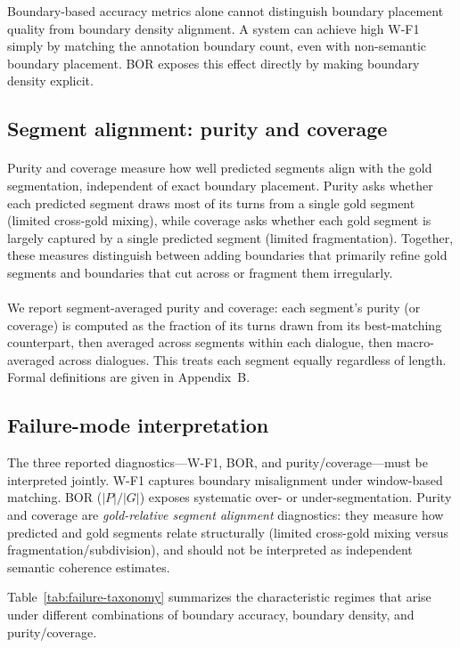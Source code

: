 \documentclass{article}
\makeatletter
\newcommand{\myparagraph}[1]{%
  \paragraph{\@addpunct{#1}}%
}
\makeatother
\begin{document}
Boundary-based accuracy metrics alone cannot distinguish boundary
placement quality from boundary density alignment. A system can achieve
high W-F1 simply by matching the annotation boundary count, even with
non-semantic boundary placement. BOR exposes this effect directly by
making boundary density explicit.

\subsection{Segment alignment: purity and coverage}
\label{sec:segment-alignment}

\myparagraph{Definition and rationale}
Purity and coverage measure how well predicted segments align with the
gold segmentation, independent of exact boundary placement. Purity asks
whether each predicted segment draws most of its turns from a single
gold segment (limited cross-gold mixing), while coverage asks whether
each gold segment is largely captured by a single predicted segment
(limited fragmentation). Together, these measures distinguish between
adding boundaries that primarily refine gold segments and boundaries
that cut across or fragment them irregularly.

\myparagraph{Aggregation}
We report segment-averaged purity and coverage: each segment's purity
(or coverage) is computed as the fraction of its turns drawn from its
best-matching counterpart, then averaged across segments within each
dialogue, then macro-averaged across dialogues. This treats each
segment equally regardless of length. Formal definitions are given in
Appendix~B.

\subsection{Failure-mode interpretation}
The three reported diagnostics---W-F1, BOR, and purity/coverage---must be
interpreted jointly. W-F1 captures boundary misalignment under window-based
matching. BOR ($|P|/|G|$) exposes systematic over- or under-segmentation. Purity
and coverage are \emph{gold-relative segment alignment} diagnostics: they measure
how predicted and gold segments relate structurally (limited cross-gold mixing
versus fragmentation/subdivision), and should not be interpreted as independent
semantic coherence estimates.

Table~\ref{tab:failure-taxonomy} summarizes the characteristic regimes that arise
under different combinations of boundary accuracy, boundary density, and
purity/coverage.
\end{document}
